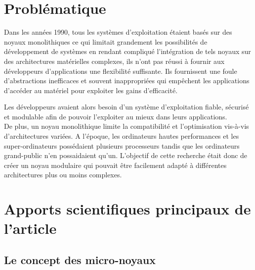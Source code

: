 \documentclass[a4paper, 12pt]{article}
\begin{document}
\clearpage 
\section{Problématique}

Dans les années 1990, tous les systèmes d'exploitation étaient basés sur des noyaux monolithiques ce qui limitait grandement les possibilités de développement de systèmes en rendant compliqué l'intégration de tels noyaux sur des architectures matérielles complexes, ils n'ont pas réussi à fournir aux développeurs d'applications une flexibilité suffisante. Ils fournissent une foule d'abstractions inefficaces et souvent inappropriées qui empêchent les applications d'accéder au matériel pour exploiter les gains d'efficacité.\newline

Les développeurs avaient alors besoin d'un système d'exploitation fiable, sécurisé et modulable afin de pouvoir l'exploiter au mieux dans leurs applications. \\
De plus, un noyau monolithique limite la compatibilité et l'optimisation vis-à-vis d'architectures variées. A l'époque, les ordinateurs hautes performances et les super-ordinateurs possédaient plusieurs processeurs tandis que les ordinateurs grand-public n'en possaidaient qu'un. L'objectif de cette recherche était donc de créer un noyau modulaire qui pouvait être facilement adapté à différentes architectures plus ou moins complexes.

\clearpage 
\section{Apports scientifiques principaux de l’article}
\subsection{Le concept des micro-noyaux}
\paragraph{}
\end{document}
